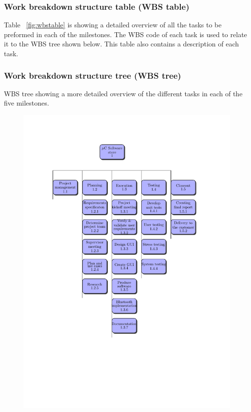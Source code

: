 \subsubsection{Work breakdown structure table (WBS table)}
Table ~\ref{fig:wbstable} is showing a detailed overview of all the tasks to be preformed in each of the milestones. The WBS code of each task is used to relate it to the WBS tree shown below. This table also contains a description of each task.



\subsubsection{Work breakdown structure tree (WBS tree)}
WBS tree showing a more detailed overview of the different tasks in each of the five milestones.
\begin{figure}[H]
\vspace*{-1.5in}
\hspace*{-1.2in}
\includegraphics[trim=0cm 4cm 0cm 0cm]{figures/wbs-tree.pdf}
\end{figure}

